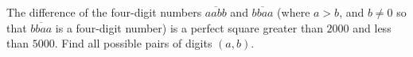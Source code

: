 The difference of the four-digit numbers $\overline{aabb}$ and $\overline{bbaa}$ (where $a>b$, and $b\ne0$ so that $\overline{bbaa}$ is a four-digit number) is a perfect square greater than $2000$ and less than $5000$. Find all possible pairs of digits $(a,b)$.
